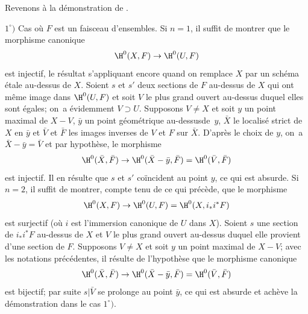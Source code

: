 Revenons \`a la d\'emonstration de .

$1^\circ)$ Cas o\`u $F$ est un faisceau d'ensembles. Si $n=1$, il suffit de montrer que le morphisme canonique
$$
\H^0(X, F)\to \H^0(U, F)$$
est injectif, le r\'esultat s'appliquant encore quand on remplace $X$ par un sch\'ema \'etale au-dessus de $X$. Soient $s$ et $s'$ deux sections de $F$ au-dessus de $X$ qui ont m\^eme image dans $\H^0(U, F)$ et soit $V$ le plus grand ouvert au-dessus duquel elles sont \'egales; on~a \'evidemment $V\supset U$. Supposons $V\neq X$ et soit $y$ un point maximal de $X-V$, $\bar y$ un point g\'eom\'etrique au-dessus\pageoriginale de~$y$, $\bar X$ le localis\'e strict de $X$ en $\bar y$ et $\bar V$ et $\bar F$ les images inverses de $V$ et $F$ sur $\bar X$. D'apr\`es le choix de $y$, on~a $\bar X-\bar y=\bar V$ et par hypoth\`ese, le morphisme
$$
\H^0(\bar X, \bar F)\to \H^0(\bar X-\bar y, \bar F)=\H^0(\bar V, \bar F)$$
est injectif. Il en r\'esulte que $s$ et $s'$ co\"incident au point $y$, ce qui est absurde. Si $n=2$, il suffit de montrer, compte tenu de ce qui pr\'ec\`ede, que le morphisme
$$
\H^0(X, F)\to \H^0(U, F)=\H^0(X, i_*i^*F)$$
est surjectif (o\`u $i$ est l'immersion canonique de $U$ dans $X$). Soient $s$ une section de $i_*i^*F$ au-dessus de $X$ et $V$ le plus grand ouvert au-dessus duquel elle provient d'une section de $F$. Supposons $V\neq X$ et soit $y$ un point maximal de $X-V$; avec les notations pr\'ec\'edentes, il r\'esulte de l'hypoth\`ese que le morphisme canonique
$$
\H^0(\bar X, \bar F)\to \H^0(\bar X-\bar y, \bar F)=\H^0(\bar V, \bar F)
$$
est bijectif; par suite $s|\bar V$ se prolonge au point $\bar y$, ce qui est absurde et ach\`eve la d\'emonstration dans le cas $1^\circ)$.

